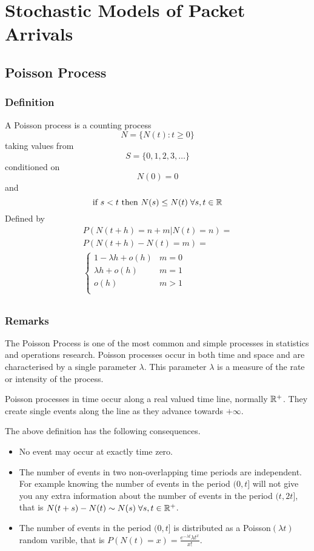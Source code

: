 \chapter{Stochastic Models of Packet Arrivals}

\section{Poisson Process}

\subsection{Definition}

A Poisson process is a counting process
\[ N = \{ N(t) : t \geq 0 \} \]
taking values from
\[ S = \{ 0,1,2,3, \ldots \} \]
conditioned on
\[N(0) = 0\]
and
\[ \mbox{if } s < t \mbox{ then } N(s) \leq N(t) \; \forall s,t \in {\Bbb R} \]
Defined by
\[
\begin{array}{c}
P(N(t+h) = n + m | N(t) = n) = \\
P(N(t+h) - N(t) = m) = \\
\left\{
\begin{array}{rl}
1 - \lambda h + o(h) & m = 0 \\
\lambda h + o(h) & m = 1 \\
o(h) & m > 1 \\
\end{array}
\right. \\
\end{array}
\]

\subsection{Remarks}

The Poisson Process is one of the most common and simple processes in
statistics and operations research.  Poisson processes occur in both
time and space and are characterised by a single parameter $\lambda$.
This parameter $\lambda$ is a measure of the rate or intensity of the
process.

Poisson processes in time occur along a real valued time line,
normally ${\Bbb R}^+$.  They create single events along the line as they
advance towards $+\infty$.

The above definition has the following consequences.

\begin{itemize}
\item	No event may occur at exactly time zero.

\item	The number of events in two non-overlapping time periods are
independent. For example knowing the number of events in the period
$(0, t]$ will not give you any extra information about the number of
events in the period $(t, 2t]$, that is $N(t+s) - N(t) \sim N(s) \;
\forall s,t \in {\Bbb R}^+$.

\item	The number of events in the period $(0, t]$ is distributed
as a Poisson$(\lambda t)$ random varible, that is $P(N(t) = x) = 
\frac{e^{-\lambda t}{\lambda t}^x}{x!}$.
\end{itemize}

